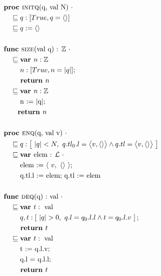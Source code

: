 \documentclass[a4paper]{scrartcl}
\newcommand{\Z}{\mathbb{Z}}
\newcommand{\refinedby}{\sqsubseteq} %
\begin{document}
\begin{align*}
& \textbf{proc }\text{\textsc{initq}(q, val N) } \cdot \\ 
    &\quad \refinedby  q : [True, q = \langle \rangle ] \\
    & \quad \refinedby q := \langle \rangle \\\\
& \textbf{func }\text{\textsc{size}(val q) : }\Z~ \cdot \\
    & \quad \refinedby \textbf{var }n : \Z \\
    & \quad \quad ~ n : [True, n = |q|] ; \\
    & \quad \quad \textbf{ return } n\\
    & \quad \refinedby \textbf{var }n : \Z \\
    & \quad \quad  \text{ n := $|$q$|$;} \\
    & \quad \quad \textbf{return } n \\\\
& \textbf{proc }\text{\textsc{enq}(q, val v) } \cdot\\
    & \quad \refinedby q : \left[~|q|< N, ~q.tl_0.l = \big\langle v, \langle \rangle \big\rangle \land q.tl =  \big\langle v, \langle \rangle \big\rangle ~\right] \\
    & \quad \refinedby \textbf{var } \text{elem : $\mathcal{L}$ } \cdot\\
    & \quad \quad \text{ elem := }\langle~v,~\langle \rangle~\rangle ;\\
    & \quad \quad \text{ q.tl.l := elem; q.tl :=  elem}\\\\
& \textbf{func }\text{\textsc{deq}(q) :} \text{ val } \cdot \\
    & \quad \refinedby \textbf{var }t : \text{ val} \\
    & \quad \quad ~q, t : \left[~|q| > 0,~q.l = q_0.l.l \land t = q_0.l.v~\right]; \\
    & \quad \quad \textbf{ return }t \\
    & \quad \refinedby \textbf{var }t : \text{ val} \\
    & \quad  \quad \text{ t := q.l.v;} \\
    & \quad  \quad \text{ q.l = q.l.l;} \\
    & \quad \quad \textbf{ return }t \\\\

\end{align*}
\end{document}
